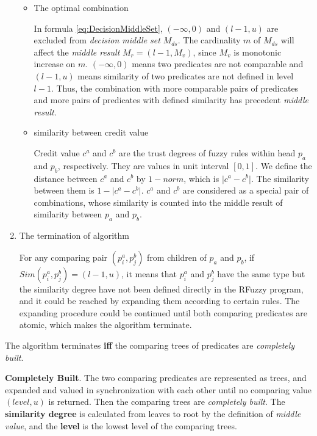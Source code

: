 \begin{enumerate}
\begin{itemize}
	\item The optimal combination
	
		In formula \ref{eq:DecisionMiddleSet}, $(-\infty,0)$ and $(l-1,u)$ are excluded from \textit{decision middle set} $M_{ds}$. The cardinality $m$ of $M_{ds}$ will affect the \textit{middle result} $M_r=(l-1,M_v)$, since $M_v$ is monotonic increase on $m$.  $(-\infty,0)$ means two predicates are not comparable and $(l-1,u)$ means similarity of two predicates are not defined in level $l-1$. Thus, the combination with more comparable pairs of predicates and more pairs of predicates with defined similarity has precedent \textit{middle result}.
		
	\item similarity between credit value
	
		Credit value $c^a$ and $c^b$ are the trust degrees of fuzzy rules within head $p_a$ and $p_b$, respectively. They are values in unit interval $[0,1]$. We define the distance between 
$c^a$ and $c^b$ by $1-norm$, which is $\lvert c^a-c^b \rvert$. The similarity between them is  $1- \lvert c^a - c^b  \rvert$. $c^a$ and $c^b$ are considered as a special pair of combinations, whose similarity is counted into the middle result of similarity between $p_a$ and $p_b$.  
	\end{itemize}
	
\item The termination of algorithm
	
	For any comparing pair $(p_i^a,p_j^b)$ from children of $p_a$ and $p_b$, if $Sim(p_i^a,p_j^b)=(l-1,u)$, it means that $p_i^a$ and $p_j^b$ have the same type but the similarity degree have not been defined directly in the RFuzzy program, and it could be reached by expanding them according to certain rules. The expanding procedure could be continued until both comparing predicates are atomic, which makes the algorithm terminate.
\end{enumerate} 


The algorithm terminates \textbf{iff} the comparing trees of predicates are \textit{completely built}.

\begin{defin} \textbf{Completely Built}.
The two comparing predicates are represented as trees, and expanded and valued in synchronization with each other until no comparing value $(level,u)$ is returned. Then the comparing trees are \textit {completely built}. The \textbf{similarity degree} is calculated from leaves to root by the definition of \textit{middle value}, and the \textbf{level} is the lowest level of the comparing trees.
\end{defin}

